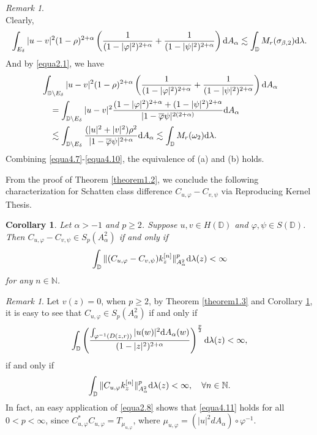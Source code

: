 \documentclass[preprint,12pt,times]{elsarticle}
\newtheorem{corollary}[theorem]{Corollary}
\theoremstyle{definition}
\theoremstyle{remark}
\newtheorem{remark}[theorem]{Remark}
\numberwithin{equation}{section}
\begin{document}
\begin{remark}
\begin{equation*}
\end{equation*}
Clearly, 
\begin{equation}\label{equa4.9}
\begin{split}
\int_{E_{\delta}}|u-v|^2(1-\rho)^{2+\alpha}\left(\frac{1}{(1-|\varphi|^2)^{2+\alpha}}+\frac{1}{(1-|\psi|^2)^{2+\alpha}}\right){\rm d}A_{\alpha} \lesssim \int_{\mathbb{D}}M_{r}(\sigma_{\beta,2}){\rm d}\lambda.
\end{split}
\end{equation}
And by \eqref{equa2.1}, we have
\begin{equation}\label{equa4.10}
\begin{split}
&\int_{\mathbb{D}\backslash E_{\delta}}|u-v|^2(1-\rho)^{2+\alpha}\left(\frac{1}{(1-|\varphi|^2)^{2+\alpha}}+\frac{1}{(1-|\psi|^2)^{2+\alpha}}\right){\rm d}A_{\alpha}\\
&\quad =\int_{\mathbb{D}\backslash E_{\delta}}|u-v|^2\frac{(1-|\varphi|^2)^{2+\alpha}+(1-|\psi|^2)^{2+\alpha}}{|1-\overline{\varphi}\psi|^{2(2+\alpha)}}{\rm d}A_{\alpha}\\
&\quad \lesssim \int_{\mathbb{D}\backslash E_{\delta}}\frac{(|u|^2+|v|^2)\rho^2}{|1-\overline{\varphi}\psi|^{2+\alpha}}{\rm d}A_{\alpha}\lesssim \int_{\mathbb{D}}M_r(\omega_2){\rm d}\lambda.
\end{split}
\end{equation}
Combining \eqref{equa4.7}-\eqref{equa4.10}, the equivalence of (a) and (b) holds.
\end{remark}

From the proof of Theorem \ref{theorem1.2}, we conclude the following characterization for Schatten class difference $C_{u,\varphi}-C_{v,\psi}$ via Reproducing Kernel Thesis.

\begin{corollary}\label{corollary4.2}
Let $\alpha>-1$ and $p\geq 2$. Suppose $u,v\in H(\mathbb{D})$ and $\varphi,\psi\in S(\mathbb{D})$. Then $C_{u,\varphi}-C_{v,\psi}\in S_p(A_{\alpha}^2)$ if and only if 
\[\int_{\mathbb{D}}\|(C_{u,\varphi}-C_{v,\psi})k_z^{[n]}\|_{A_{\alpha}^2}^p{\rm d}\lambda(z)<\infty\]
for any $n\in\mathbb{N}$. 
\end{corollary}

\begin{remark}\label{remark3.3}
Let $v(z)=0$, when $p\geq 2$, by Theorem \ref{theorem1.3} and Corollary \ref{corollary4.2}, it is easy to see that $C_{u,\varphi}\in S_p(A_{\alpha}^2)$ if and only if
\begin{equation}\label{equa4.11}
\int_{\mathbb{D}}\left(\frac{\int_{\varphi^{-1}(D(z,r))}|u(w)|^2{\rm d}A_{\alpha}(w)}{(1-|z|^2)^{2+\alpha}}\right)^{\frac{p}{2}}{\rm d}\lambda(z)<\infty,
\end{equation}
if and only if
\begin{equation*}
\int_{\mathbb{D}}\|C_{u,\varphi}k_z^{[n]}\|_{A_{\alpha}^2}^p{\rm d}\lambda(z)<\infty,\quad \forall n\in\mathbb{N}.
\end{equation*}
In fact, an easy application of \eqref{equa2.8} shows that \eqref{equa4.11} holds for all $0<p<\infty$, since $C_{u,\varphi}^*C_{u,\varphi}=T_{\mu_{u,\varphi}}$, where $\mu_{u,\varphi}=(|u|^2dA_{\alpha})\circ\varphi^{-1}$.
\end{remark}
\end{document}
